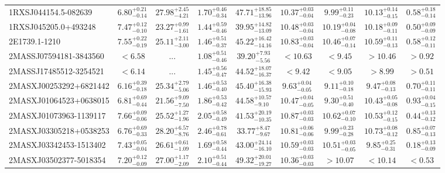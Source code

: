 \documentclass[onecolumn]{mn2e}
\begin{document}
{\begin{center}
\begin{longtable}{lcccccccc}
\hline \hline
\endfoot
1RXSJ044154.5-082639 & $6.80_{-0.14}^{+0.21}$ & $27.98_{-4.21}^{+2.45}$ & $1.70_{-0.34}^{+0.46}$ &$47.71_{-13.96}^{+18.85}$ & $10.37_{-0.04}^{+0.03}$ & $9.99_{-0.23}^{+0.11}$ & $10.13_{-0.15}^{+0.14}$ & $0.58_{-0.14}^{+0.18}$ \\
1RXSJ045205.0+493248 & $7.47_{-0.10}^{+0.12}$ & $23.27_{-1.61}^{+0.99}$ & $1.44_{-0.46}^{+0.59}$ &$39.95_{-13.09}^{+14.82}$ & $10.48_{-0.04}^{+0.03}$ & $10.19_{-0.08}^{+0.04}$ & $10.18_{-0.11}^{+0.09}$ & $0.50_{-0.09}^{+0.09}$ \\
2E1739.1-1210 & $7.55_{-0.19}^{+0.22}$ & $25.11_{-3.00}^{+2.11}$ & $1.46_{-0.37}^{+0.51}$ &$45.22_{-14.16}^{+16.42}$ & $10.83_{-0.04}^{+0.03}$ & $10.46_{-0.14}^{+0.07}$ & $10.59_{-0.13}^{+0.11}$ & $0.58_{-0.11}^{+0.12}$ \\
2MASSJ07594181-3843560 & $<6.58$ & ... & $1.08_{-0.46}^{+0.51}$ &$39.20_{-5.56}^{+7.93}$ & $<10.63$ & $<9.45$ & $>10.46$ & $>0.92$ \\
2MASSJ17485512-3254521 & $<6.14$ & ... & $1.45_{-0.47}^{+0.56}$ &$44.52_{-16.37}^{+18.07}$ & $<9.42$ & $<9.05$ & $>8.99$ & $>0.51$ \\
2MASXJ00253292+6821442 & $6.16_{-0.18}^{+0.39}$ & $25.34_{-5.06}^{+2.79}$ & $1.46_{-0.40}^{+0.53}$ &$45.40_{-15.93}^{+16.38}$ & $9.63_{-0.05}^{+0.04}$ & $9.11_{-0.18}^{+0.10}$ & $9.47_{-0.13}^{+0.08}$ & $0.70_{-0.11}^{+0.11}$ \\
2MASXJ01064523+0638015 & $6.81_{-0.44}^{+0.69}$ & $21.56_{-7.50}^{+9.09}$ & $1.86_{-0.42}^{+0.53}$ &$44.58_{-9.10}^{+10.57}$ & $10.47_{-0.05}^{+0.04}$ & $9.30_{-0.40}^{+0.51}$ & $10.43_{-0.08}^{+0.05}$ & $0.93_{-0.15}^{+0.04}$ \\
2MASXJ01073963-1139117 & $7.66_{-0.06}^{+0.09}$ & $25.52_{-1.96}^{+1.27}$ & $2.05_{-0.49}^{+0.58}$ &$41.53_{-10.35}^{+20.19}$ & $10.87_{-0.03}^{+0.03}$ & $10.62_{-0.10}^{+0.07}$ & $10.53_{-0.15}^{+0.12}$ & $0.44_{-0.12}^{+0.13}$ \\
2MASXJ03305218+0538253 & $6.76_{-0.33}^{+0.69}$ & $28.20_{-8.76}^{+6.57}$ & $2.46_{-0.61}^{+0.78}$ &$33.77_{-9.67}^{+8.47}$ & $10.81_{-0.06}^{+0.06}$ & $9.99_{-0.28}^{+0.23}$ & $10.73_{-0.12}^{+0.08}$ & $0.85_{-0.13}^{+0.07}$ \\
2MASXJ03342453-1513402 & $7.43_{-0.04}^{+0.05}$ & $26.61_{-1.09}^{+0.61}$ & $1.69_{-0.44}^{+0.58}$ &$43.00_{-16.10}^{+24.14}$ & $10.59_{-0.03}^{+0.03}$ & $10.51_{-0.05}^{+0.03}$ & $9.85_{-0.31}^{+0.25}$ & $0.18_{-0.09}^{+0.13}$ \\
2MASXJ03502377-5018354 & $7.20_{-0.09}^{+0.12}$ & $27.00_{-2.09}^{+1.17}$ & $2.10_{-0.44}^{+0.51}$ &$49.32_{-19.27}^{+20.01}$ & $10.36_{-0.03}^{+0.03}$ & $>10.07$ & $<10.14$ & $<0.53$ \\

\end{longtable}
\end{center}}
\end{document}
